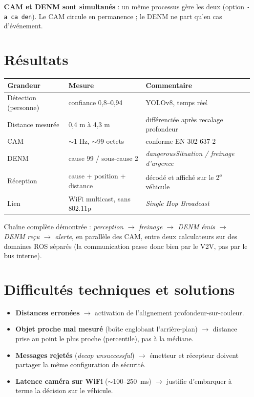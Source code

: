 \documentclass[a4paper,11pt]{article}
\newcommand{\code}[1]{\texttt{\small #1}}
\begin{document}
\textbf{CAM et DENM sont simultanés} : un même processus gère les deux (option \code{-a ca den}).
Le CAM circule en permanence ; le DENM ne part qu'en cas d'événement.

\section{Résultats}
\begin{center}\small
\begin{tabularx}{\textwidth}{@{}l l X@{}}
\toprule
\textbf{Grandeur} & \textbf{Mesure} & \textbf{Commentaire} \\
\midrule
Détection (personne) & confiance 0,8--0,94 & YOLOv8, temps réel \\
Distance mesurée & 0,4 m à 4,3 m & différenciée après recalage profondeur \\
CAM & $\sim$1 Hz, $\sim$99 octets & conforme EN 302 637-2 \\
DENM & cause 99 / sous-cause 2 & \emph{dangerousSituation / freinage d'urgence} \\
Réception & cause + position + distance & décodé et affiché sur le 2\textsuperscript{e} véhicule \\
Lien & WiFi multicast, sans 802.11p & \emph{Single Hop Broadcast} \\
\bottomrule
\end{tabularx}
\end{center}

\begin{note}
Chaîne complète démontrée : \emph{perception $\to$ freinage $\to$ DENM émis $\to$ DENM reçu
$\to$ alerte}, en parallèle des CAM, entre deux calculateurs sur des domaines ROS séparés (la
communication passe donc bien par le V2V, pas par le bus interne).
\end{note}

\section{Difficultés techniques et solutions}
\begin{itemize}[leftmargin=1.5em, itemsep=1pt]
  \item \textbf{Distances erronées} $\to$ activation de l'alignement profondeur-sur-couleur.
  \item \textbf{Objet proche mal mesuré} (boîte englobant l'arrière-plan) $\to$ distance prise au
        point le plus proche (percentile), pas à la médiane.
  \item \textbf{Messages rejetés} (\emph{decap unsuccessful}) $\to$ émetteur et récepteur doivent
        partager la même configuration de sécurité.
  \item \textbf{Latence caméra sur WiFi} ($\sim$100--250~ms) $\to$ justifie d'embarquer à terme la
        décision sur le véhicule.
\end{itemize}
\end{document}
